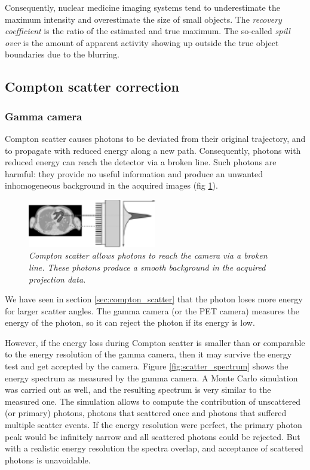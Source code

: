 \documentclass[11pt,oneside]{article}
\begin{document}
Consequently, nuclear medicine imaging systems tend to underestimate
the maximum intensity and overestimate the size of small objects. The
{\em recovery coefficient} is the ratio of the estimated and true
maximum. The so-called {\em spill over} is the amount of apparent
activity showing up outside the true object boundaries due to the
blurring.

\subsection{Compton scatter correction} \label{sec:scatter}
\subsubsection{Gamma camera} \label{sec:spectscatcor}
Compton scatter causes photons to be deviated from their original trajectory,
and to propagate with reduced energy along a new path. Consequently, photons
with reduced energy can reach the detector via a broken line. Such photons are
harmful: they provide no useful information and produce an unwanted
inhomogeneous background in the acquired images (fig
\ref{fig:scatter_gammacamera}).

\begin{figure}[tb]
\centering
\includegraphics[width=0.5\textwidth]{figs/fig_scatter_gammacamera.pdf}
\caption{\label{fig:scatter_gammacamera} \emph{Compton scatter allows
photons to reach the camera via a broken line. These photons produce a smooth
background in the acquired projection data.}}
\end{figure}

We have seen in section \ref{sec:compton_scatter} that the photon loses more
energy for larger scatter angles. The gamma camera (or the PET camera) measures
the energy of the photon, so it can reject the photon if its energy is low.

However, if the energy loss during Compton scatter is smaller than or
comparable to the energy resolution of the gamma camera, then it may
survive the energy test and get accepted by the camera. Figure
\ref{fig:scatter_spectrum} shows the energy spectrum as measured by
the gamma camera. A Monte Carlo simulation was carried out as well,
and the resulting spectrum is very similar to the measured one. The
simulation allows to compute the contribution of unscattered (or
primary) photons, photons that scattered once and photons that
suffered multiple scatter events. If the energy resolution were
perfect, the primary photon peak would be infinitely narrow and all
scattered photons could be rejected. But with a realistic energy
resolution the spectra overlap, and acceptance of scattered photons is
unavoidable.
\end{document}
